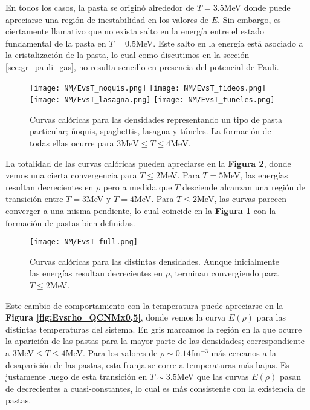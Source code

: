 En todos los casos, la pasta se originó alrededor de $T=3.5$MeV donde puede apreciarse una región de inestabilidad en los valores de $E$.
Sin embargo, es ciertamente llamativo que no exista salto en la energía entre el estado fundamental de la pasta en $T=0.5$MeV.
Este salto en la energía está asociado a la cristalización de la pasta, lo cual como discutimos en la sección  \ref{sec:gr_pauli_gas}, no resulta sencillo en presencia del potencial de Pauli.

\begin{figure}[H]
	\centering	%
	\texttt{[image: NM/EvsT\_noquis.png]}
	\texttt{[image: NM/EvsT\_fideos.png]}
	\texttt{[image: NM/EvsT\_lasagna.png]}
	\texttt{[image: NM/EvsT\_tuneles.png]}
	\caption{Curvas calóricas para las densidades representando un tipo de pasta particular; ñoquis, spaghettis, lasagna y túneles.
	La formación de todas ellas ocurre para $3\text{MeV}\leq T\leq4\text{MeV}$.}
	\label{fig:EvsT_pastas}
\end{figure}

La totalidad de las curvas calóricas pueden apreciarse en la \textbf{Figura \ref{fig:EvsT_QCNMx0,5}}, donde vemos una cierta convergencia para $T\leq 2$MeV.
Para $T=5$MeV, las energías resultan decrecientes en $\rho$ pero a medida que $T$ desciende alcanzan una región de transición entre $T=3$MeV y $T=4$MeV.
Para $T\leq2$MeV, las curvas parecen converger a una misma pendiente, lo cual coincide en la \textbf{Figura \ref{fig:EvsT_pastas}} con la formación de pastas bien definidas. 

\begin{figure}[H]
	\centering
	\texttt{[image: NM/EvsT\_full.png]}
	\caption{Curvas calóricas para las distintas densidades. 
	Aunque inicialmente las energías resultan decrecientes en $\rho$, terminan convergiendo para $T\leq 2$MeV.}
	\label{fig:EvsT_QCNMx0,5}
\end{figure}

Este cambio de comportamiento con la temperatura puede apreciarse en la \textbf{Figura \ref{fig:Evsrho_QCNMx0,5}}, donde vemos la curva $E(\rho)$ para  las distintas temperaturas del sistema.
En gris marcamos la región en la que ocurre la aparición de las pastas para la mayor parte de las densidades; correspondiente a $3$MeV$\leq T\leq4$MeV.
Para los valores de $\rho\sim 0.14$fm$^{-3}$ más cercanos a la desaparición de las pastas, esta franja se corre a temperaturas más bajas. 
Es justamente luego de esta transición en $T\sim 3.5$MeV que las curvas $E(\rho)$ pasan de decrecientes a cuasi-constantes, lo cual es más consistente con la existencia de pastas.

